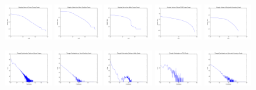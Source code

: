 \documentclass[12pt]{article}
\begin{document}
\begin{figure}
  \includegraphics[width=0.19\textwidth]{singval_loglog}
  \includegraphics[width=0.19\textwidth]{overflow_singval_loglog}
  \includegraphics[width=0.19\textwidth]{miller_singval_loglog}
  \includegraphics[width=0.19\textwidth]{pos_singval_loglog}
  \includegraphics[width=0.19\textwidth]{kron_singval_loglog}
  
  \includegraphics[width=0.19\textwidth]{triads}
  \includegraphics[width=0.19\textwidth]{overflow_triads}
  \includegraphics[width=0.19\textwidth]{miller_triads}
  \includegraphics[width=0.19\textwidth]{pos_triads}
  \includegraphics[width=0.19\textwidth]{kron_triads}
  \label{fig:plots}


\end{figure}
\end{document}
